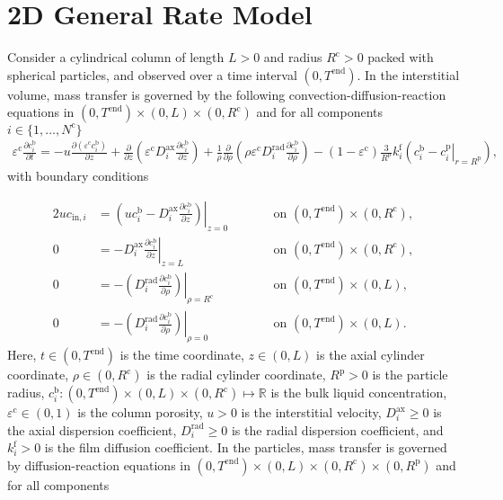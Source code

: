 \documentclass{article}
\begin{document}
\section*{2D General Rate Model}
Consider a cylindrical column of length $L > 0$  and radius $R^{\mathrm{c}} > 0$ packed with spherical particles, and observed over a time interval $(0, T^{\mathrm{end}})$.
In the interstitial volume, mass transfer is governed by the following convection-diffusion-reaction equations in $(0, T^\mathrm{end})\times (0, L)\times (0, R^\mathrm{c})$ and for all components $i\in\{1, \dots, N^{\mathrm{c}} \}$
\begin{align}
\varepsilon^{\mathrm{c}} \frac{\partial c^{\mathrm{b}}_i}{\partial t} = - u \frac{\partial \left( \varepsilon^{\mathrm{c}} c^{\mathrm{b}}_i \right)}{\partial z} + \frac{\partial}{\partial z} \left( \varepsilon^{\mathrm{c}} D^{\mathrm{ax}}_{i} \frac{\partial c^{\mathrm{b}}_i}{\partial z} \right) + \frac{1}{\rho} \frac{\partial}{\partial \rho} \left( \rho \varepsilon^{\mathrm{c}} D^{\mathrm{rad}}_{i}  \frac{\partial c^{\mathrm{b}}_i}{\partial \rho} \right)- \left(1 - \varepsilon^{\mathrm{c}} \right) \frac{3}{R^{\mathrm{p}}} k^{\mathrm{f}}_{i} \left(c^{\mathrm{b}}_i - \left. c^{\mathrm{p}}_{i} \right|_{r = R^{\mathrm{p}}} \right),
\end{align}
with boundary conditions

\begin{alignat}{2}
u c_{\mathrm{in},i} &= \left.\left( u c^{\mathrm{b}}_i - D^{\mathrm{ax}}_{i} \frac{\partial c^{\mathrm{b}}_i}{\partial z}\right)\right|_{z=0} & &\qquad\text{on }(0, T^{\mathrm{end}})\times (0, R^{\mathrm{c}}),\\
               0 &= - D^{\mathrm{ax}}_{i} \left. \frac{\partial c^{\mathrm{b}}_i}{\partial z} \right|_{z=L} & &\qquad\text{on }(0, T^{\mathrm{end}})\times (0, R^{\mathrm{c}}),\\
0 &= - \left(D^{\mathrm{rad}}_{i} \left. \frac{\partial c^{\mathrm{b}}_i}{\partial \rho} \right) \right|_{\rho=R^{\mathrm{c}}} & &\qquad\text{on }(0, T^{\mathrm{end}}) \times (0, L),\\
0 &= - \left(D^{\mathrm{rad}}_{i} \left. \frac{\partial c^{\mathrm{b}}_i}{\partial \rho} \right) \right|_{\rho=0} & &\qquad\text{on }(0, T^{\mathrm{end}}) \times (0, L).
\end{alignat}
Here, $t\in (0, T^{\mathrm{end}})$ is the time coordinate, $z\in (0, L)$ is the axial cylinder coordinate, $\rho\in (0, R^{\mathrm{c}})$ is the radial cylinder coordinate, $R^\mathrm{p}> 0$ is the particle radius, $c^{\mathrm{b}}_i\colon (0, T^\mathrm{end})\times (0, L)\times (0, R^\mathrm{c}) \mapsto \mathbb{R}$ is the bulk liquid concentration, $\varepsilon^{\mathrm{c}}\in (0, 1)$ is the column porosity, $u> 0$ is the interstitial velocity, $D^\mathrm{ax}_i\geq 0$ is the axial dispersion coefficient, $D^\mathrm{rad}_i\geq 0$ is the radial dispersion coefficient, and $k^\mathrm{f}_{i}> 0$ is the film diffusion coefficient.
In the particles, mass transfer is governed by diffusion-reaction equations in $ (0, T^\mathrm{end}) \times (0, L)\times (0, R^\mathrm{c})\times (0, R^{\mathrm{p}})$ and for all components
\end{document}
